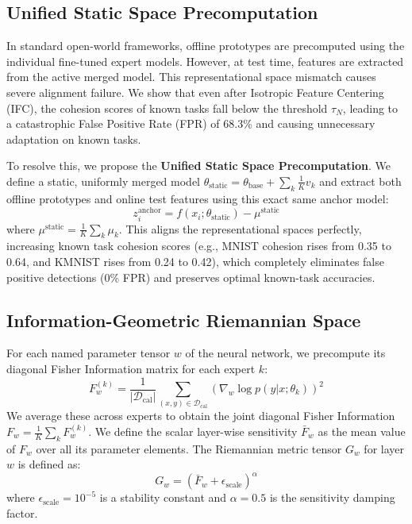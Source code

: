 \documentclass{article}
\theoremstyle{plain}
\theoremstyle{definition}
\theoremstyle{remark}
\begin{document}
\subsection{Unified Static Space Precomputation}
In standard open-world frameworks, offline prototypes are precomputed using the individual fine-tuned expert models. However, at test time, features are extracted from the active merged model. This representational space mismatch causes severe alignment failure. We show that even after Isotropic Feature Centering (IFC), the cohesion scores of known tasks fall below the threshold $\tau_N$, leading to a catastrophic False Positive Rate (FPR) of 68.3\% and causing unnecessary adaptation on known tasks.

To resolve this, we propose the \textbf{Unified Static Space Precomputation}. We define a static, uniformly merged model $\theta_{\text{static}} = \theta_{\text{base}} + \sum_k \frac{1}{K} v_k$ and extract both offline prototypes and online test features using this exact same anchor model:
\begin{equation}
    z^{\text{anchor}}_i = f(x_i; \theta_{\text{static}}) - \mu^{\text{static}}
\end{equation}
where $\mu^{\text{static}} = \frac{1}{K} \sum_k \mu_k$. This aligns the representational spaces perfectly, increasing known task cohesion scores (e.g., MNIST cohesion rises from 0.35 to 0.64, and KMNIST rises from 0.24 to 0.42), which completely eliminates false positive detections (0\% FPR) and preserves optimal known-task accuracies.

\subsection{Information-Geometric Riemannian Space}
For each named parameter tensor $w$ of the neural network, we precompute its diagonal Fisher Information matrix for each expert $k$:
\begin{equation}
    F_w^{(k)} = \frac{1}{|\mathcal{D}_{\text{cal}}|} \sum_{(x,y) \in \mathcal{D}_{\text{cal}}} \left( \nabla_w \log p(y|x; \theta_k) \right)^2
\end{equation}
We average these across experts to obtain the joint diagonal Fisher Information $F_w = \frac{1}{K} \sum_k F_w^{(k)}$. We define the scalar layer-wise sensitivity $\bar{F}_w$ as the mean value of $F_w$ over all its parameter elements. The Riemannian metric tensor $G_w$ for layer $w$ is defined as:
\begin{equation}
    G_w = \left(\bar{F}_w + \epsilon_{\text{scale}}\right)^\alpha
\end{equation}
where $\epsilon_{\text{scale}} = 10^{-5}$ is a stability constant and $\alpha = 0.5$ is the sensitivity damping factor.
\end{document}
